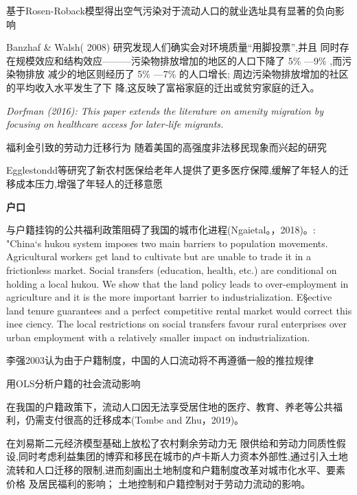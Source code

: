 \documentclass[a4paper,12pt,oneside]{book} %
\begin{document}
\cite{SunWeiZengKongQiWuRanYuLaoDongLiDeKongJianLiuDongJiYuLiuDongRenKouJiuYeXuanZhiXingWeiDeYanJiu2019}
基于Rosen-Roback模型得出空气污染对于流动人口的就业选址具有显著的负向影响

Banzhaf \& Walsh( 2008) 研究发现人们确实会对环境质量“用脚投票”,并且 同时存在规模效应和结构效应———污染物排放增加的地区的人口下降了 5\% —9\% ,而污染物排放 减少的地区则经历了 5\% —7\% 的人口增长; 周边污染物排放增加的社区的平均收入水平发生了下 降,这反映了富裕家庭的迁出或贫穷家庭的迁入。


\textit{Dorfman (2016): This paper extends the literature on amenity migration by focusing on healthcare access for later‐life migrants.}


福利金引致的劳动力迁移行为
\cite{benjaminImportingPoorWelfare2004}
\cite{mckinnishWelfareinducedMigrationState2007}
随着美国的高强度非法移民现象而兴起的研究

Egglestondd等研究了新农村医保给老年人提供了更多医疗保障,缓解了年轻人的迁移成本压力,增强了年轻人的迁移意愿




\textbf{户口}

与户籍挂钩的公共福利政策阻碍了我国的城市化进程(Ngaietal。，2018)。\cite{ngaiChinasMobilityBarriers2019}: "China‘s hukou system imposes two main barriers to population movements. Agricultural workers get land to cultivate but are unable to trade it in a frictionless market. Social transfers (education, health, etc.) are conditional on holding a local hukou. We show that the land policy leads to over-employment in agriculture and it is the more important barrier to industrialization. E§ective land tenure guarantees and a perfect competitive rental market would correct this ine¢ ciency. The local restrictions on social transfers favour rural enterprises over urban employment with a relatively smaller impact on industrialization.

李强2003认为由于户籍制度，中国的人口流动将不再遵循一般的推拉规律

\cite{LuYiLongHuKouHuanQiZuoYongMaHuJiZhiDuYuSheHuiFenCengHeLiuDong2008}用OLS分析户籍的社会流动影响

在我国的户籍政策下，流动人口因无法享受居住地的医疗、教育、养老等公共福利，仍需支付很高的迁移成本(Tombe and Zhu，2019)。

\cite{ZhouWenTuDiLiuZhuanHuJiZhiDuGaiGeYuZhongGuoChengShiHuaLiLunYuMoNi2017}
在刘易斯二元经济模型基础上放松了农村剩余劳动力无  限供给和劳动力同质性假设,同时考虑利益集团的博弈和移民在城市的卢卡斯人力资本外部性,通过引入土地流转和人口迁移的限制,进而刻画出土地制度和户籍制度改革对城市化水平、要素价格  及居民福利的影响；
土地控制和户籍控制对于劳动力流动的影响。
\end{document}
